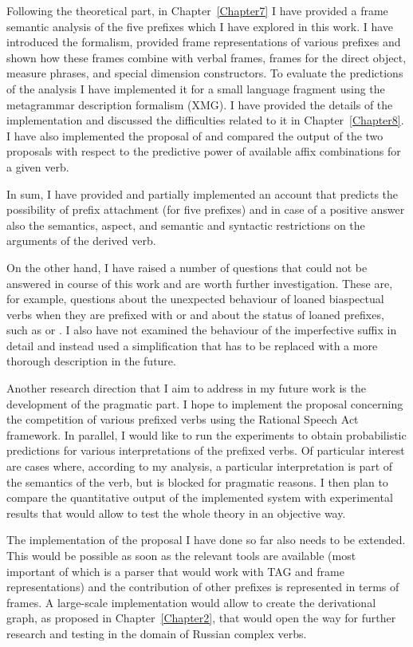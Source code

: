 Following the theoretical part,  in Chapter~\ref{Chapter7} I have provided a frame semantic analysis of the five prefixes which I have explored in this work. I have introduced the formalism, provided frame representations of various prefixes and shown how these frames combine with verbal frames, frames for the direct object, measure phrases, and special dimension constructors. To evaluate the predictions of the analysis I have implemented it for a small language fragment using the metagrammar description formalism (XMG). I have provided the details of the implementation and discussed the difficulties related to it in Chapter~\ref{Chapter8}. I have also implemented the proposal of \citet{Tatevosov:09} and compared the output of the two proposals with respect to the predictive power of available affix combinations for a given verb. 

In sum, I have provided and partially implemented an account that predicts the possibility of prefix attachment (for five prefixes) and in case of a positive answer also the semantics, aspect, and semantic and syntactic restrictions on the arguments of the derived verb. 

On the other hand, I have raised a number of questions that could not be answered in course of this work and are worth further investigation. These are, for example, questions about the unexpected behaviour of loaned biaspectual verbs when they are prefixed with  or  and about the status of loaned prefixes, such as  or . I also have not examined the behaviour of the imperfective suffix in detail and instead used a simplification that has to be replaced with a more thorough description in the future. 

Another research direction that I aim to address in my future work is the development of the pragmatic part. I hope to implement the proposal concerning the competition of various prefixed verbs using the Rational Speech Act framework. In parallel, I would like to run the experiments to obtain probabilistic predictions for various interpretations of the prefixed verbs.  Of particular interest are cases where, according to my analysis, a particular interpretation is part of the semantics of the verb, but is blocked for pragmatic reasons. I then plan to compare the quantitative output of the implemented system with experimental results that would allow to test the whole theory in an objective way.

The implementation of the proposal I have done so far also needs to be extended. This would be possible as soon as the relevant tools are available (most important of which is a parser that would work with TAG and frame representations) and the contribution of other prefixes is represented in terms of frames. A large-scale implementation would allow to create the derivational graph, as proposed in Chapter~\ref{Chapter2}, that would open the way for further research and testing in the domain of Russian complex verbs. 
